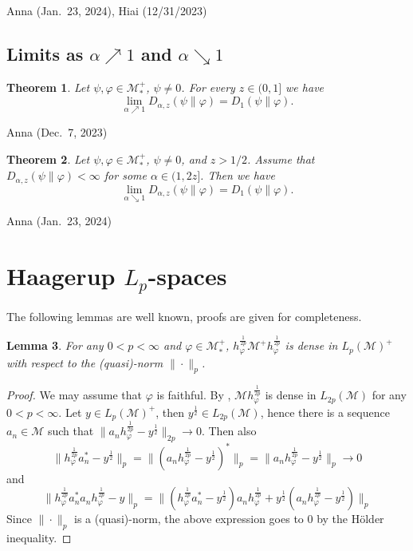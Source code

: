 \documentclass[12pt]{article}
\newtheorem{theorem}{Theorem}[section]
\newtheorem{lemma}[theorem]{Lemma}
\theoremstyle{definition}
\theoremstyle{remark}
\numberwithin{equation}{section}
\def\Me{\mathcal M}
\def\ffi{\varphi}
\begin{document}
{\color{magenta}Anna (Jan.\ 23, 2024), Hiai (12/31/2023)}

\subsection{Limits as $\alpha\nearrow1$ and $\alpha\searrow1$}

\begin{theorem}
Let $\psi,\ffi\in\Me_*^+$, $\psi\ne0$. For every $z\in(0,1]$ we have
\[
\lim_{\alpha\nearrow1}D_{\alpha,z}(\psi\|\ffi)=D_1(\psi\|\ffi).
\]
\end{theorem}
{\color{magenta}Anna (Dec.\ 7, 2023)}

\begin{theorem}
Let $\psi,\ffi\in\Me_*^+$, $\psi\ne0$, and $z>1/2$. Assume that $D_{\alpha,z}(\psi\|\ffi)<\infty$ for some
$\alpha\in(1,2z]$. Then we have
\[
\lim_{\alpha\searrow1}D_{\alpha,z}(\psi\|\ffi)=D_1(\psi\|\ffi).
\]
\end{theorem}
{\color{magenta}Anna (Jan.\ 23, 2024)}


\appendix

\section{Haagerup  $L_p$-spaces}


The following lemmas are well known, proofs are given for completeness.

\begin{lemma}\label{lemma:cone} For any $0<p<\infty$ and $\varphi\in \Me_*^+$, 
$h_\varphi^{\frac1{2p}}\Me^+h_\varphi^{\frac1{2p}}$ is dense in $L_p(\Me)^+$ with respect
to the (quasi)-norm $\|\cdot\|_p$.

\end{lemma}

\begin{proof} We may assume that $\varphi$ is faithful. By \cite[Lemma 1.1]{junge2003noncommutative}, $\Me
h_\varphi^{\frac1{2p}}$ is dense in $L_{2p}(\Me)$ for any $0<p<\infty$. Let $y\in L_p(\Me)^+$, then
$y^{\frac12}\in L_{2p}(\Me)$, hence there is a sequence $a_n\in \Me$ such that
$\|a_nh^{\frac1{2p}}_\varphi-y^{\frac12}\|_{2p}\to 0$. Then also 
\[
\|h^{\frac1{2p}}_\varphi
a_n^*-y^{\frac12}\|_p=\|(a_nh^{\frac1{2p}}_\varphi-y^{\frac12})^*\|_p=\|a_nh^{\frac1{2p}}_\varphi-y^{\frac12}\|_p\to 0
\]
and 
\[
\|h^{\frac1{2p}}_\varphi a_n^*a_nh^{\frac1{2p}}_\varphi-y\|_p=\|(h^{\frac1{2p}}_\varphi
a_n^*-y^{\frac12})a_nh^{\frac1{2p}}_\varphi+y^{\frac12}(a_nh^{\frac1{2p}}_\varphi-y^{\frac12})\|_p
\]
Since $\|\cdot\|_p$ is a (quasi)-norm, the above expression goes to 0 by the H\"older
inequality.



\end{proof}
\end{document}
